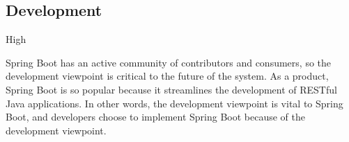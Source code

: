 \subsection*{Development}

\ranking High

Spring Boot has an active community of contributors and consumers, so the development viewpoint is critical to the future of the system. As a product, Spring Boot is so popular because it streamlines the development of RESTful Java applications. In other words, the development viewpoint is vital to Spring Boot, and developers choose to implement Spring Boot because of the development viewpoint. 
